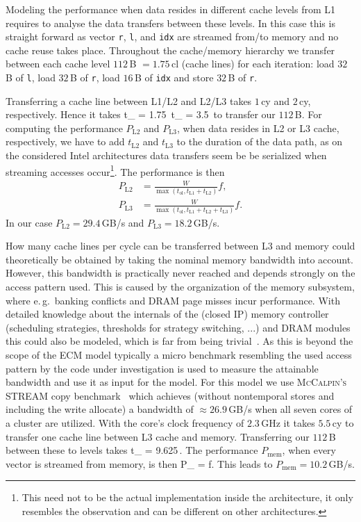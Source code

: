 {Modeling the performance when data resides in different cache levels from L1
requires to analyse the data transfers between these levels.
In this case this is straight forward as vector \verb'r', \verb'l', and
\verb'idx' are streamed from/to memory and no cache reuse takes place.
Throughout the cache/memory hierarchy we transfer between each cache level
$112$\,B $= 1.75$\,cl (cache lines) for each iteration: load $32$\,B of
\verb'l', load $32$\,B of \verb'r', load $16$\,B of \verb'idx' and store $32$\,B
of \verb'r'.

Transferring a cache line between L1/L2 and L2/L3 takes $1$\,cy and $2$\,cy,
respectively. Hence it takes
%
\be
  t_ = 1.75\,\cyw {} t_ = 3.5\,\cyw
\ee
%
to transfer our $112$\,B.
For computing the performance $P_\text{L2}$ and $P_\text{L3}$, when data resides
in L2 or L3 cache, respectively, we
have to add $t_\text{L2}$ and $t_\text{L3}$ to the duration of the data path, as on the considered
Intel architectures data transfers seem be be serialized when streaming accesses
occur\footnote{This need not to be the actual implementation inside the
architecture, it only resembles the observation and can be different on other
architectures.}.
The performance is then
%
\begin{align}
  P_\text{L2} &= \frac{W}{\max(t_\text{ol}, t_\text{L1} + t_\text{L2})} f, \\
  P_\text{L3} &= \frac{W}{\max(t_\text{ol}, t_\text{L1} + t_\text{L2} +
t_\text{L3})} f.
\end{align}
%
In our case $P_\text{L2} = 29.4$\,GB/s and $P_\text{L3} = 18.2$\,GB/s.
%

How many cache lines per cycle can be transferred between L3 and memory could
theoretically be obtained by taking the nominal memory bandwidth into account.
However, this bandwidth is practically never reached and depends strongly on the
access pattern used.
This is caused by the organization of the memory subsystem, where e.\,g.\ banking
conflicts and DRAM page misses incur performance.
With detailed knowledge about the internals of the (closed IP) memory controller
(scheduling strategies, thresholds for strategy switching, ...) and DRAM modules
this could also be modeled, which is far from being trivial~\cite{jacob-2007}.
As this is beyond the scope of the ECM model typically a micro benchmark
resembling the used access pattern by the code under investigation is used
to measure the attainable bandwidth and use it as input for the model.
%
For this model we use \textsc{McCalpin's} STREAM copy
benchmark~\cite{mccalpin-1995} which achieves (without nontemporal stores and
including the write allocate) a bandwidth of $\approx 26.9$\,GB/s when all seven cores
of a cluster are utilized.
With the core's clock frequency of $2.3$\,GHz it takes $5.5$\,cy to transfer one
cache line between L3 cache and memory.
Transferring our $112$\,B between these to levels takes
%
\be
  t_ = 9.625\,\cyw.
\ee
%
The performance $P_\text{mem}$, when every vector is streamed from memory, is then
%
\be
  P_ =  f.
\ee
%
This leads to $P_\text{mem} = 10.2$\,GB/s. 

}
